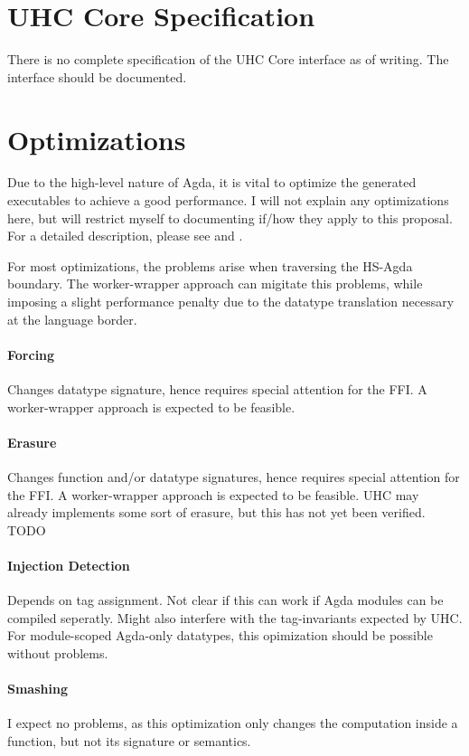 \documentclass[12pt, a4paper, twoside]{report}
\begin{document}
\section{UHC Core Specification}
There is no complete specification of the UHC Core interface as of writing. The interface
should be documented.

\section{Optimizations}
Due to the high-level nature of Agda, it is vital to optimize the generated
executables to achieve a good performance. I will not explain any optimizations here,
but will restrict myself to documenting if/how they apply to this proposal.
For a detailed description, please see \cite{fredriksson2011totaly} and \cite{Brady-store-indices2004}.

For most optimizations, the problems arise when traversing the HS-Agda boundary. The worker-wrapper
approach can migitate this problems, while imposing a slight performance penalty due to the
datatype translation necessary at the language border.
\paragraph{Forcing}
Changes datatype signature, hence requires special attention for the FFI.
A worker-wrapper approach is expected to be feasible.

\paragraph{Erasure}
Changes function and/or datatype signatures, hence requires special attention for the FFI.
A worker-wrapper approach is expected to be feasible.
UHC may already implements some sort of erasure, but this has not yet been verified.
TODO

\paragraph{Injection Detection}
Depends on tag assignment. Not clear if this can work if Agda modules can be compiled
seperatly. Might also interfere with the tag-invariants expected by UHC.
For module-scoped Agda-only datatypes, this opimization should be possible without
problems.

\paragraph{Smashing}
I expect no problems, as this optimization only changes the computation inside a function, but not
its signature or semantics.
\end{document}
